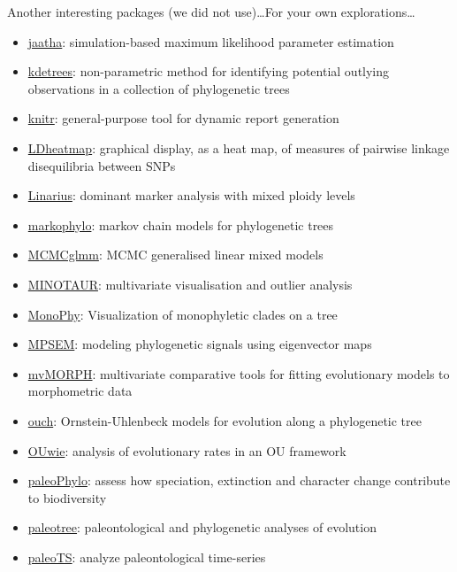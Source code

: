 \documentclass[compress, ucs, xelatex, 11pt, xcolor=svgnames,
  hyperref={
    bookmarks=true,
    unicode=true,
    colorlinks=true,
    pdftitle={Molecular data in R},
    plainpages=false,
    pdfauthor={Vojtech Zeisek},
    pdfsubject={Course about phylogeny and evolution in R},
    pdfcreator={XeLaTeX},
    pdfkeywords={R, evolution, phylogeny, molecular data},
    linkcolor=Tomato,
    anchorcolor=SaddleBrown,
    citecolor=Goldenrod,
    filecolor=DarkMagenta,
    menucolor=Sienna,
    urlcolor=DarkTurquoise,
    pdftex},
  url={hyphens, lowtilde} %
  ]{beamer}
\begin{document}
\begin{frame}[allowframebreaks]{Another interesting packages (we did not use)\ldots}{For your own explorations\ldots}
\begin{itemize}
    \item \href{https://CRAN.R-project.org/package=jaatha}{jaatha}: simulation-based maximum likelihood parameter estimation
    \item \href{https://CRAN.R-project.org/package=kdetrees}{kdetrees}: non-parametric method for identifying potential outlying observations in a collection of phylogenetic trees
    \item \href{https://CRAN.R-project.org/package=knitr}{knitr}: general-purpose tool for dynamic report generation
    \item \href{https://CRAN.R-project.org/package=LDheatmap}{LDheatmap}: graphical display, as a heat map, of measures of pairwise linkage disequilibria between SNPs
    \item \href{https://github.com/giby/Linarius}{Linarius}: dominant marker analysis with mixed ploidy levels
    \item \href{https://CRAN.R-project.org/package=markophylo}{markophylo}: markov chain models for phylogenetic trees
    \item \href{https://CRAN.R-project.org/package=MCMCglmm}{MCMCglmm}: MCMC generalised linear mixed models
    \item \href{https://github.com/NESCent/MINOTAUR}{MINOTAUR}: multivariate visualisation and outlier analysis
    \item \href{https://cran.r-project.org/package=MonoPhy}{MonoPhy}: Visualization of monophyletic clades on a tree
    \item \href{https://CRAN.R-project.org/package=MPSEM}{MPSEM}: modeling phylogenetic signals using eigenvector maps
    \item \href{https://CRAN.R-project.org/package=mvMORPH}{mvMORPH}: multivariate comparative tools for fitting evolutionary models to morphometric data
    \item \href{https://CRAN.R-project.org/package=ouch}{ouch}: Ornstein-Uhlenbeck models for evolution along a phylogenetic tree
    \item \href{https://CRAN.R-project.org/package=OUwie}{OUwie}: analysis of evolutionary rates in an OU framework
    \item \href{https://r-forge.r-project.org/projects/paleophylo/}{paleoPhylo}: assess how speciation, extinction and character change contribute to biodiversity
    \item \href{https://CRAN.R-project.org/package=paleotree}{paleotree}: paleontological and phylogenetic analyses of evolution
    \item \href{https://CRAN.R-project.org/package=paleoTS}{paleoTS}: analyze paleontological time-series

\end{itemize}
\end{frame}
\end{document}
